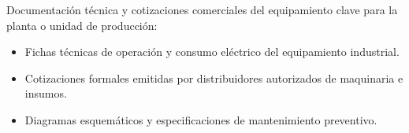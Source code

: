
Documentación técnica y cotizaciones comerciales del equipamiento clave para la planta o unidad de producción:
\begin{itemize}
    \item Fichas técnicas de operación y consumo eléctrico del equipamiento industrial.
    \item Cotizaciones formales emitidas por distribuidores autorizados de maquinaria e insumos.
    \item Diagramas esquemáticos y especificaciones de mantenimiento preventivo.
\end{itemize}
